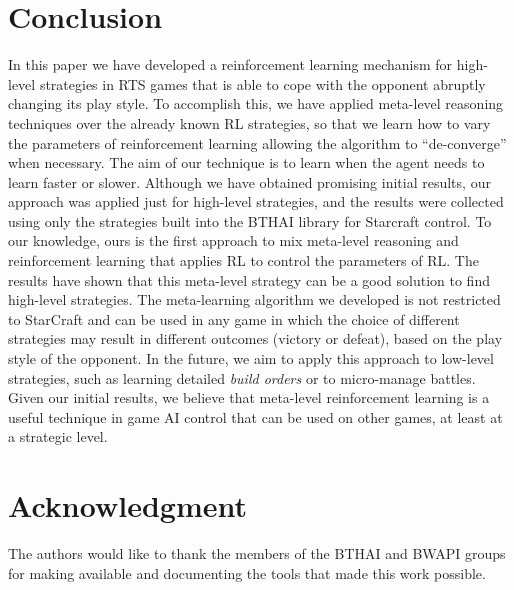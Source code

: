 \section{Conclusion}
\label{sec:conclusion}

In this paper we have developed a reinforcement learning mechanism for high-level strategies in RTS games that is able to cope with the opponent abruptly changing its play style. 
To accomplish this, we have applied meta-level reasoning techniques over the already known RL strategies, so that we learn how to vary the parameters of reinforcement learning allowing the algorithm to ``de-converge'' when necessary.
The aim of our technique is to learn when the agent needs to learn faster or slower. 
Although we have obtained promising initial results, our approach was applied just for high-level strategies, and the results were collected using only the strategies built into the BTHAI library for Starcraft control.
To our knowledge, ours is the first approach to mix meta-level reasoning and reinforcement learning that applies RL to control the parameters of RL.
The results have shown that this meta-level strategy can be a good solution to find high-level strategies.
The meta-learning algorithm we developed is not restricted to StarCraft and can be used in any game in which the choice of different strategies may result in different outcomes (victory or defeat), based on the play style of the opponent. 
In the future, we aim to apply this approach to low-level strategies, such as learning detailed \textit{build orders} or to micro-manage battles.
Given our initial results, we believe that meta-level reinforcement learning is a useful technique in game AI control that can be used on other games, at least at a strategic level. 

\section*{Acknowledgment}
\label{sec:acknowledgment}

The authors would like to thank the members of the BTHAI and BWAPI groups for making available and documenting the tools that made this work possible.